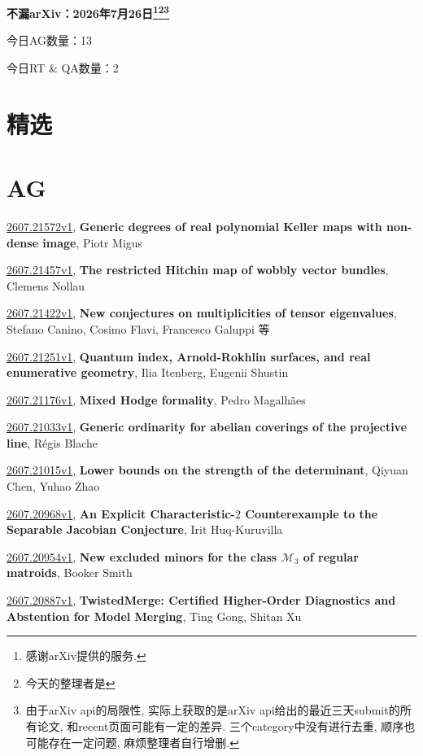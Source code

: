 \documentclass[9pt, a4paper]{article}
\theoremstyle{plain}
\theoremstyle{definition}
\theoremstyle{remark}
\newcommand{\arxiv}[3]{\href{https://arxiv.org/abs/#1}{#1}, \textbf{\textcolor{arxivblue}{#2}}, #3}
\newcommand{\AGnumber}{13}
\newcommand{\RTQAnumber}{2}
\newcommand{\NewestDate}{2026年7月26日}
\newcommand{\todayarXiver}{} %
\begin{document}
\begin{center}
    \Huge\textbf{不漏arXiv：\NewestDate\footnote{感谢arXiv提供的服务.}\footnote{今天的整理者是\todayarXiver}\footnote{由于arXiv api的局限性, 实际上获取的是arXiv api给出的最近三天submit的所有论文, 和recent页面可能有一定的差异. 三个category中没有进行去重, 顺序也可能存在一定问题, 麻烦整理者自行增删.}} \\
\end{center}

\setcounter{section}{-1}

\begin{center}
    今日AG数量：\AGnumber
    
    今日RT \& QA数量：\RTQAnumber
    
\end{center}


\section{精选}


\section{AG}
\arxiv{2607.21572v1}{Generic degrees of real polynomial Keller maps with non-dense image}{Piotr Migus}

\arxiv{2607.21457v1}{The restricted Hitchin map of wobbly vector bundles}{Clemens Nollau}

\arxiv{2607.21422v1}{New conjectures on multiplicities of tensor eigenvalues}{Stefano Canino, Cosimo Flavi, Francesco Galuppi 等}

\arxiv{2607.21251v1}{Quantum index, Arnold-Rokhlin surfaces, and real enumerative geometry}{Ilia Itenberg, Eugenii Shustin}

\arxiv{2607.21176v1}{Mixed Hodge formality}{Pedro Magalhães}

\arxiv{2607.21033v1}{Generic ordinarity for abelian coverings of the projective line}{Régis Blache}

\arxiv{2607.21015v1}{Lower bounds on the strength of the determinant}{Qiyuan Chen, Yuhao Zhao}

\arxiv{2607.20968v1}{An Explicit Characteristic-$2$ Counterexample to the Separable Jacobian Conjecture}{Irit Huq-Kuruvilla}

\arxiv{2607.20954v1}{New excluded minors for the class $\mathcal{M}_3$ of regular matroids}{Booker Smith}

\arxiv{2607.20887v1}{TwistedMerge: Certified Higher-Order Diagnostics and Abstention for Model Merging}{Ting Gong, Shitan Xu}
\end{document}

